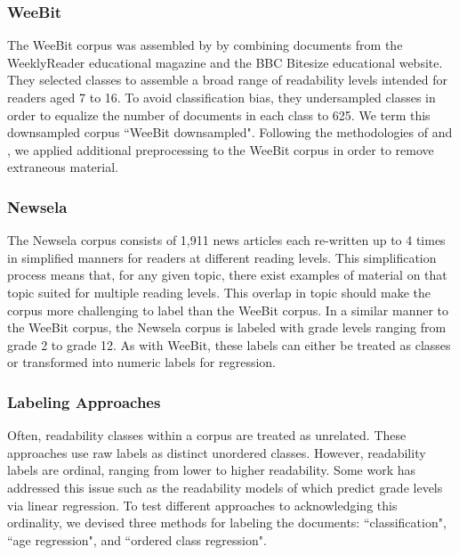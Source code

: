 \documentclass[11pt,a4paper]{article}
\theoremstyle{definition}
\begin{document}
\subsubsection{WeeBit}
The WeeBit corpus was assembled by \citet{vajjalaImprovingAccuracyReadability2012} by combining documents from the WeeklyReader educational magazine and the BBC Bitesize educational website. They selected classes to assemble a broad range of readability levels intended for readers aged 7 to 16. To avoid classification bias, they undersampled classes in order to equalize the number of documents in each class to 625. We term this downsampled corpus ``WeeBit downsampled". Following the methodologies of \citet{xiaTextReadabilityAssessment2016} and \citet{ martincSupervisedUnsupervisedNeural2019}, we applied additional preprocessing to the WeeBit corpus in order to remove extraneous material.

\subsubsection{Newsela}
\label{sec:NewselaMethod}
 The Newsela corpus \citep{xiaTextReadabilityAssessment2016} consists of 1,911 news articles each re-written up to 4 times in simplified manners for readers at different reading levels. This simplification process means that, for any given topic, there exist examples of material on that topic suited for multiple reading levels. This overlap in topic should make the corpus more challenging to label than the WeeBit corpus. In a similar manner to the WeeBit corpus, the Newsela corpus is labeled with grade levels ranging from grade 2 to grade 12. As with WeeBit, these labels can either be treated as classes or transformed into numeric labels for regression.

\subsubsection{Labeling Approaches}
Often, readability classes within a corpus are treated as unrelated. These approaches use raw labels as distinct unordered classes. However, readability labels are ordinal, ranging from lower to higher readability. Some work has addressed this issue such as the readability models of \citet{flor-etal-2013-lexical} which predict grade levels via linear regression. To test different approaches to acknowledging this ordinality, we devised three methods for labeling the documents: ``classification", ``age regression", and ``ordered class regression".
\end{document}
